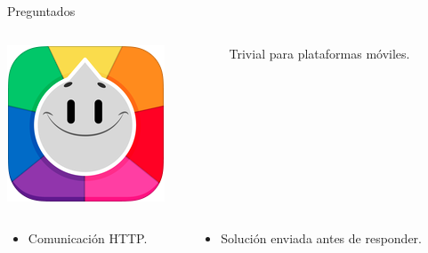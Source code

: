 \begin{frame}{Preguntados}
\begin{columns}
    \begin{column}{0.15\textwidth}
        \includegraphics[width=\textwidth,keepaspectratio]{imgs/preguntados_logo.png}
    \end{column}
    \begin{column}{0.85\textwidth}
        Trivial para plataformas móviles.
    \end{column}
\end{columns}

\begin{columns}
    \begin{column}{0.5\textwidth}
    \begin{itemize}
        \item<2-> Comunicación HTTP.
    \end{itemize}
    \end{column}

    \begin{column}{0.5\textwidth}
    \begin{itemize}
        \item<3-> Solución enviada antes de responder.
    \end{itemize}
    \end{column}
\end{columns}




\end{frame}

